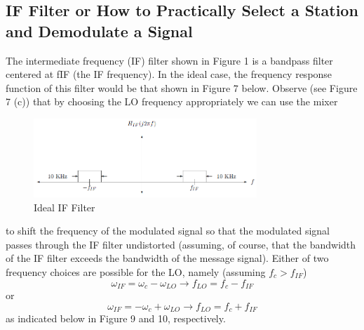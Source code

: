 \documentclass [utf8] {article}
\begin{document}
\subsection{IF Filter or How to Practically Select a Station and Demodulate a Signal}
{
	The intermediate frequency (IF) filter shown in Figure 1 is a bandpass filter centered at fIF (the IF frequency). In the ideal case, the frequency response function of this filter would be that shown in Figure 7 below. Observe (see Figure 7 (c)) that by choosing the LO frequency appropriately we can use the mixer

	\begin{figure}[H]
		\begin{small}
			\begin{center}
				\includegraphics[width=0.75\textwidth]{figures/Figure8.png}
			\end{center}
			\caption{Ideal IF Filter}
			\label{fig:idealif}
		\end{small}
	\end{figure}

	to shift the frequency of the modulated signal so that the modulated signal passes through the IF filter undistorted (assuming, of course, that the bandwidth of the IF filter exceeds the bandwidth of the message signal). Either of two frequency choices are possible for the LO, namely (assuming $f_c > f_{IF}$)
	$$\omega_{IF} = \omega_c-\omega_{LO}\rightarrow f_{LO} = f_c-f_{IF}$$
	or
	$$\omega_{IF} = -\omega_c+\omega_{LO}\rightarrow f_{LO} = f_c+f_{IF}$$
	as indicated below in Figure 9 and 10, respectively.

}
\end{document}

